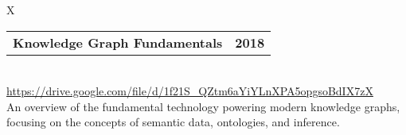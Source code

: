 \documentclass[10pt]{article}
\newcommand{\tabularxwidth}{\textwidth}
\begin{document}
        \begin{minipage}{\tabularxwidth}
        \begin{tabularx}{\tabularxwidth}{X}
            {
                \begin{tabularx}{\tabularxwidth}{@{}X r}
                    \textbf{Knowledge Graph Fundamentals} &
                    \textbf{
        2018} \\
                \end{tabularx}
            } \\

            

            
                \url{https://drive.google.com/file/d/1f21S_QZtm6aYiYLnXPA5opgsoBdIX7zX} \\
            
            

            
    An overview of the fundamental technology powering modern knowledge graphs, focusing on the concepts of semantic data, ontologies, and inference.
        \end{tabularx}
        
            \vspace{.3em}
        

        \end{minipage}
    
\end{document}
